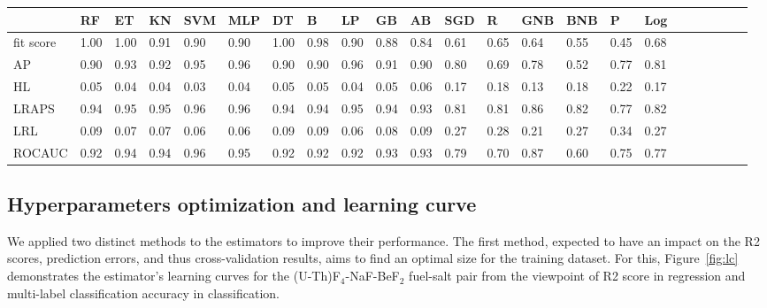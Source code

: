 \begin{landscape}
\begin{table}[ht!]
		\begin{tabular}{l>{\columncolor[gray]{0.9}}l>{\columncolor[gray]{0.9}}
				l>{\columncolor[gray]{0.9}}l>{\columncolor[gray]{0.9}}
				l>{\columncolor[gray]{0.9}}llllllllllllllllll}
			\hline
			& \textbf{\gls{RF}} & \textbf{\gls{ET}} & \textbf{\gls{KN}}	&
			\textbf{\gls{SVM}}   & \textbf{\gls{MLP}}& \textbf{\gls{DT}} &
			\textbf{\gls{B}} &
			\textbf{\gls{LP}} & \textbf{\gls{GB}}  & \textbf{\gls{AB}} &
			\textbf{\gls{SGD}}	& \textbf{\gls{R}} &
			\textbf{\gls{GNB}}  & \textbf{\gls{BNB}}& \textbf{\gls{P}}&
			\textbf{\gls{Log}}\\
			\hline
			fit score  	& 1.00 	& 1.00 	& 0.91 	& 0.90 	& 0.90 	& 1.00 	& 0.98 	& 0.90
			& 0.88 & 0.84 	& 0.61 	& 0.65 	& 0.64 	& 0.55 	& 0.45 	& 0.68\\
			\gls{AP} & 0.90 	& 0.93 	& 0.92 	& 0.95 	& 0.96 	& 0.90 	&
			0.90 	& 0.96 	& 0.91 & 0.90 	& 0.80 	& 0.69 	& 0.78 	& 0.52 	& 0.77 	& 0.81\\
			\gls{HL} & 0.05 	& 0.04 	& 0.04 	& 0.03 	& 0.04 	& 0.05 	&
			0.05 	& 0.04 	& 0.05 & 0.06 	& 0.17 	& 0.18 	& 0.13 	& 0.18 	& 0.22 	& 0.17\\
			\gls{LRAPS} & 0.94 	& 0.95 	& 0.95 	& 0.96 	& 0.96 	& 0.94 	& 0.94
			& 0.95 	& 0.94 & 0.93 	& 0.81 	& 0.81 	& 0.86 	& 0.82 	& 0.77 	& 0.82\\
			\gls{LRL} & 0.09 	& 0.07 	& 0.07 	& 0.06 	& 0.06 	& 0.09 	&
			0.09 	& 0.06 	& 0.08 & 0.09 	& 0.27 	& 0.28 	& 0.21 	& 0.27 	& 0.34 	& 0.27\\
			\gls{ROCAUC} & 0.92 	& 0.94 	& 0.94 	& 0.96 	& 0.95 	& 0.92 	&
			0.92 	&
			0.92 	& 0.93 & 0.93 	& 0.79 	& 0.70 	& 0.87 	& 0.60 	& 0.75 	& 0.77\\
			\hline
		\end{tabular}
		\label{table:classification}
	\end{table}
\end{landscape}

\subsection{Hyperparameters optimization and learning curve}

    We applied two distinct methods to the estimators to improve their performance. The first method, expected to have an impact on the \gls{R2} scores, prediction errors, and thus cross-validation results, aims to find an optimal size for the training dataset. For this, Figure~\ref{fig:lc} demonstrates the estimator's learning curves for the (U-Th)F$_4$-NaF-BeF$_2$ fuel-salt pair from the viewpoint of \gls{R2} score in regression and multi-label classification accuracy in classification.

